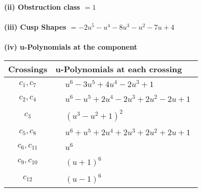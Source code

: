 \documentclass[1p]{elsarticle_modified}
\theoremstyle{definition}
\begin{document}
\flushleft \textbf{(ii) Obstruction class $= 1$}\\~\\
\flushleft \textbf{(iii) Cusp Shapes $= -2 u^5- u^4-8 u^3- u^2-7 u+4$}\\~\\
\newpage\renewcommand{\arraystretch}{1}
\flushleft \textbf{(iv) u-Polynomials at the component}\newline \\
\begin{tabular}{m{50pt}|m{274pt}}
Crossings & \hspace{64pt}u-Polynomials at each crossing \\
\hline $$\begin{aligned}c_{1},c_{7}\end{aligned}$$&$\begin{aligned}
&u^6-3 u^5+4 u^4-2 u^3+1
\end{aligned}$\\
\hline $$\begin{aligned}c_{2},c_{4}\end{aligned}$$&$\begin{aligned}
&u^6- u^5+2 u^4-2 u^3+2 u^2-2 u+1
\end{aligned}$\\
\hline $$\begin{aligned}c_{3}\end{aligned}$$&$\begin{aligned}
&(u^3- u^2+1)^2
\end{aligned}$\\
\hline $$\begin{aligned}c_{5},c_{8}\end{aligned}$$&$\begin{aligned}
&u^6+u^5+2 u^4+2 u^3+2 u^2+2 u+1
\end{aligned}$\\
\hline $$\begin{aligned}c_{6},c_{11}\end{aligned}$$&$\begin{aligned}
&u^6
\end{aligned}$\\
\hline $$\begin{aligned}c_{9},c_{10}\end{aligned}$$&$\begin{aligned}
&(u+1)^6
\end{aligned}$\\
\hline $$\begin{aligned}c_{12}\end{aligned}$$&$\begin{aligned}
&(u-1)^6
\end{aligned}$\\
\hline
\end{tabular}\\~\\
\end{document}
